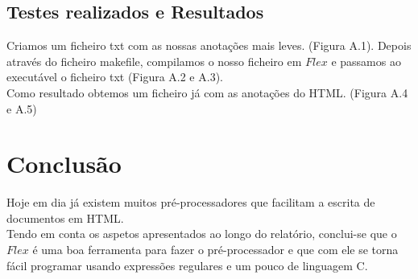 \documentclass{report}
\begin{document}
\section{Testes realizados e Resultados}

Criamos um ficheiro txt com as nossas anotações mais leves. (Figura A.1). Depois através do ficheiro makefile, compilamos o nosso ficheiro em $Flex$ e passamos ao executável o ficheiro txt (Figura A.2 e A.3).\\ 
Como resultado obtemos um ficheiro já com as anotações do HTML. (Figura A.4 e A.5) 



\chapter{Conclusão} \label{concl}

Hoje em dia já existem muitos pré-processadores que facilitam a escrita de documentos em HTML.\\
Tendo em conta os aspetos apresentados ao longo do relatório, conclui-se que o $Flex$ é uma boa ferramenta para fazer o pré-processador e que com ele se torna fácil programar usando expressões regulares e um pouco de linguagem C. 



\appendix
\end{document}
